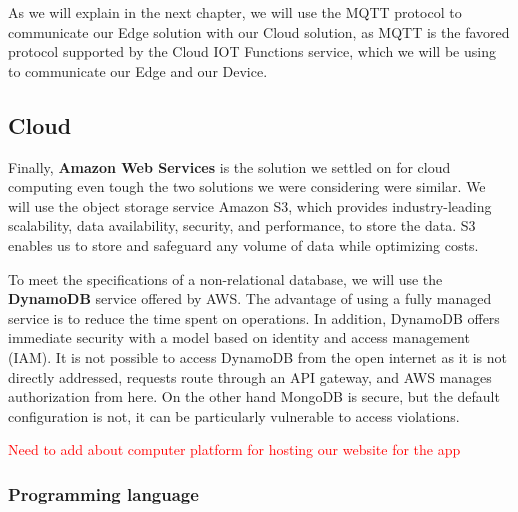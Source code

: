As we will explain in the next chapter, we will use the MQTT protocol to communicate our Edge solution with our Cloud solution, as MQTT is the favored protocol supported by the Cloud IOT Functions service, which we will be using to communicate our Edge and our Device.

\subsection{Cloud}
Finally, \textbf{Amazon Web Services} is the solution we settled on for cloud computing even tough the two solutions we were considering were similar. We will use the object storage service Amazon S3, which provides industry-leading scalability, data availability, security, and performance, to store the data. S3 enables us to store and safeguard any volume of data while optimizing costs. 

To meet the specifications of a non-relational database, we will use the \textbf{DynamoDB} service offered by AWS. The advantage of using a fully managed service is to reduce the time spent on operations.
In addition, DynamoDB offers immediate security with a model based on identity and access management (IAM). It is not possible to access DynamoDB from the open internet as it is not directly addressed, requests route through an API gateway, and AWS manages authorization from here.
On the other hand MongoDB is secure, but the default configuration is not, it can be particularly vulnerable to access violations. 

\textcolor{red}{Need to add about computer platform for hosting our website for the app}\\

\subsubsection*{Programming language}
